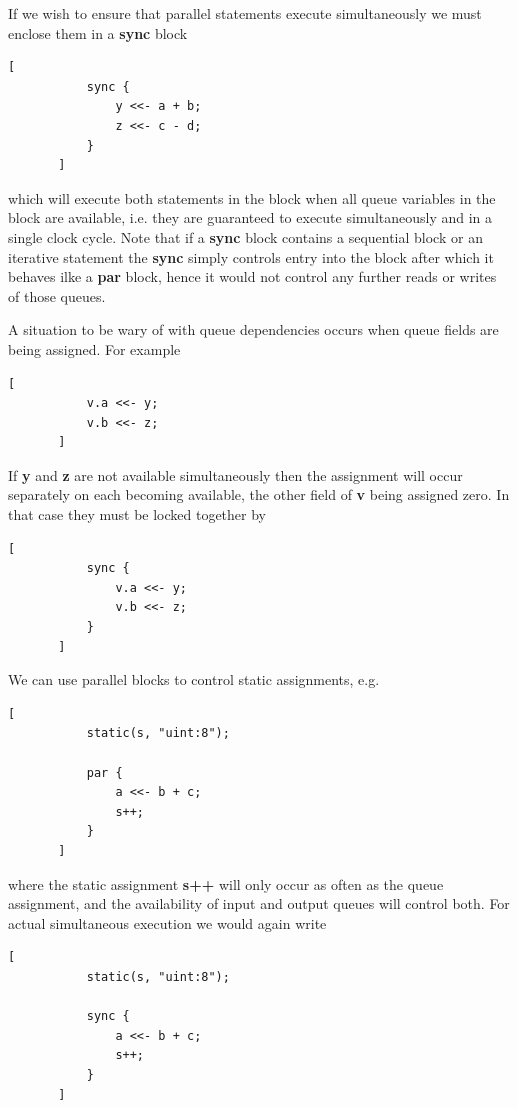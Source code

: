     If we wish to ensure that parallel statements execute simultaneously
    we must enclose them in a {\bf sync} block
    \begin{lstlisting}[gobble=4, language=threepl]
       [
           sync {
               y <<- a + b;
               z <<- c - d;
           }
       ]
    \end{lstlisting}
    which will execute both statements in the block when all queue variables
    in the block are available, i.e. they are guaranteed to execute
    simultaneously and in a single clock cycle. Note that if a {\bf sync}
    block contains a sequential block or an iterative statement the {\bf
    sync} simply controls entry into the block after which it behaves ilke a
    {\bf par} block, hence it would not control any further reads or
    writes of those queues.

    A situation to be wary of with queue dependencies occurs
    when queue fields are being assigned. For example
    \begin{lstlisting}[gobble=4, language=threepl]
       [
           v.a <<- y;
           v.b <<- z;
       ]
    \end{lstlisting}
    If {\bf y} and {\bf z} are not available simultaneously
    then the assignment will occur separately on each
    becoming available, the other field of {\bf v} being
    assigned zero. In that case they must be locked together by
    \begin{lstlisting}[gobble=4, language=threepl]
       [
           sync {
               v.a <<- y;
               v.b <<- z;
           }
       ]
    \end{lstlisting}        

    We can use parallel blocks to control static
    assignments, e.g.
    \begin{lstlisting}[gobble=4, language=threepl]
       [
           static(s, "uint:8");

           par {
               a <<- b + c;
               s++;
           }
       ]
    \end{lstlisting}
    where the static assignment {\bf s++} will only occur as
    often as the queue assignment, and the availability of
    input and output queues will control both. For actual
    simultaneous execution we would again write
    \begin{lstlisting}[gobble=4, language=threepl]
       [
           static(s, "uint:8");

           sync {
               a <<- b + c;
               s++;
           }
       ]
    \end{lstlisting}

